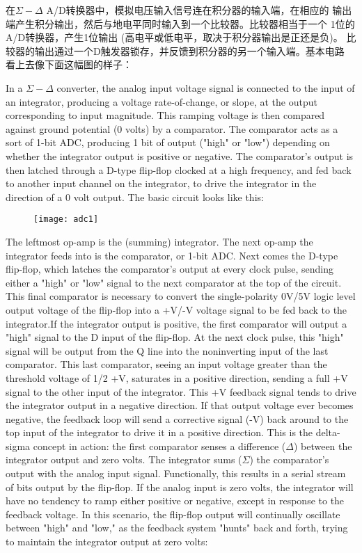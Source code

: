 在$\Sigma-\Delta$ A/D转换器中，模拟电压输入信号连在积分器的输入端，在相应的
输出端产生积分输出，然后与地电平同时输入到一个比较器。比较器相当于一个
1位的A/D转换器，产生1位输出 (高电平或低电平，取决于积分器输出是正还是负)。
比较器的输出通过一个D触发器锁存，并反馈到积分器的另一个输入端。基本电路
看上去像下面这幅图的样子：
\fi

In a $\Sigma-\Delta$ converter, the analog input voltage signal is connected
to the input of an integrator, producing a voltage rate-of-change, or slope,
at the output corresponding to input magnitude. This ramping voltage is then
compared against ground potential (0 volts) by a comparator. The comparator
acts as a sort of 1-bit ADC, producing 1 bit of output ("high" or "low")
depending on whether the integrator output is positive or negative. The
comparator's output is then latched through a D-type flip-flop clocked at a
high frequency, and fed back to another input channel on the integrator,
to drive the integrator in the direction of a 0 volt output. The basic
circuit looks like this:

\begin{figure}[!h]
\centering
\texttt{[image: adc1]}
\end{figure}

\iffalse
运放A是一个积分器。它的后级运放是一个比较器，也可看作1位A/D转换器。
1位A/D转换器输出通过D触发器锁存，在时钟脉冲作用下输出连续的高、低电平
序列。
\fi

The leftmost op-amp is the (summing) integrator. The next op-amp the
integrator feeds into is the comparator, or 1-bit ADC. Next comes the
D-type flip-flop, which latches the comparator's output at every clock
pulse, sending either a "high" or "low" signal to the next comparator at
the top of the circuit. This final comparator is necessary to convert the
single-polarity 0V/5V logic level output voltage of the flip-flop into a
+V/-V voltage signal to be fed back to the integrator.If the integrator
output is positive, the first comparator will output a "high" signal to the D
input of the flip-flop. At the next clock pulse, this "high" signal will be
output from the Q line into the noninverting input of the last comparator.
This last comparator, seeing an input voltage greater than the threshold
voltage of 1/2 +V, saturates in a positive direction, sending a full +V
signal to the other input of the integrator. This +V feedback signal tends
to drive the integrator output in a negative direction. If that output
voltage ever becomes negative, the feedback loop will send a corrective
signal (-V) back around to the top input of the integrator to drive it in
a positive direction. This is the delta-sigma concept in action: the first
comparator senses a difference ($\Delta$) between the integrator output and
zero volts. The integrator sums ($\Sigma$) the comparator's output with the
analog input signal. Functionally, this results in a serial stream of bits
output by the flip-flop. If the analog input is zero volts, the integrator
will have no tendency to ramp either positive or negative, except in
response to the feedback voltage. In this scenario, the flip-flop output
will continually oscillate between "high" and "low," as the feedback system
"hunts" back and forth, trying to maintain the integrator output at zero
volts: 
 

